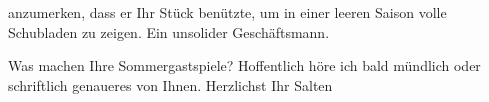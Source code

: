                anzumerken, dass er Ihr Stück\label{K_L03306-3v}\label{K_L03306-3} benützte, um in einer leeren Saison volle
               Schubladen zu zeigen. Ein unsolider Geschäftsmann.\pend
           
\pstart
           Was machen Ihre Sommergastspiele? Hoffentlich höre ich bald mündlich oder schriftlich
               genaueres von Ihnen.\pend
           \pstart Herzlichst Ihr \spacefill\mbox{Salten}\pend{}\endnumbering{}  
      